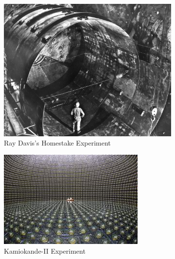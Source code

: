 \begin{figure}[htp]
\centering
	\begin{subfigure}[b]{.3\textwidth}
    \includegraphics[width=\textwidth]{figs/homestake.jpg}
    \caption{Ray Davis's Homestake Experiment \cite{homestake}}
    \label{fig:homestake}
    \end{subfigure}
    \quad
    \begin{subfigure}[b]{.3\textwidth}
    \includegraphics[width=\textwidth]{figs/kamiokande.jpg}
    \caption{Kamiokande-II Experiment \cite{kamiokande}}
    \label{fig:kamiokande}
    \end{subfigure}
    \quad
    \begin{subfigure}[b]{.3\textwidth}

\end{subfigure}
\end{figure}
